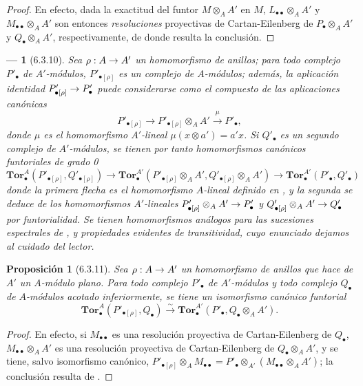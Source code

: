 \documentclass[10pt,oneside,openany]{book}
\theoremstyle{egaenv}\newtheorem*{env}{---}
\theoremstyle{egastatement}
\newtheorem*{proposition}{Proposición}
\theoremstyle{egadescription}
\newcommand{\oldpage}[2][]{\marginnote{\normalfont\scriptsize\textbf{#1}\,|\,#2}\ignorespaces}
\renewcommand{\to}{\mathchoice{\longrightarrow}{\rightarrow}{\rightarrow}{\rightarrow}}
\begin{document}
\begin{proof}
\oldpage[III]{145}
En efecto, dada la exactitud del funtor $M\otimes_A A'$ en $M$,
$L_{\bullet\bullet}\otimes_A A'$ y $M_{\bullet\bullet}\otimes_A A'$ son
entonces \emph{resoluciones} proyectivas de Cartan-Eilenberg de
$P_\bullet\otimes_A A'$ y $Q_\bullet\otimes_A A'$, respectivamente, de
donde resulta la conclusión.
\end{proof}

\begin{env}[6.3.10]
\label{III.6.3.10}
Sea $\rho:A\to A'$ un homomorfismo de anillos; para todo complejo
$P'_\bullet$ de $A'$-módulos, $P'_{\bullet[\rho]}$ es un complejo de
$A$-módulos; además, la aplicación identidad
$P'_{\bullet[\rho]}\to P'_\bullet$ puede considerarse como el compuesto de
las aplicaciones canónicas
\[
  P'_{\bullet[\rho]}\longrightarrow
  P'_{\bullet[\rho]}\otimes_A A'
  \xrightarrow{\mu}P'_\bullet,
\]
donde $\mu$ es el homomorfismo $A'$-lineal $\mu(x\otimes a')=a'x$. Si
$Q'_\bullet$
es un segundo complejo de $A'$-módulos, se tienen por tanto homomorfismos
canónicos funtoriales de grado 0
\[
  \mathbf{Tor}_\bullet^A(P'_{\bullet[\rho]},Q'_{\bullet[\rho]})
  \longrightarrow
  \mathbf{Tor}_\bullet^{A'}
  (P'_{\bullet[\rho]}\otimes_A A',Q'_{\bullet[\rho]}\otimes_A A')
  \longrightarrow
  \mathbf{Tor}_\bullet^{A'}(P'_\bullet,Q'_\bullet)
  \tag{6.3.10.1}\label{III.6.3.10.1.fr}
\]
donde la primera flecha es el homomorfismo $A$-lineal definido en
, y la
segunda se deduce de los homomorfismos $A'$-lineales
$P'_{\bullet[\rho]}\otimes_A A'\to P'_\bullet$ y
$Q'_{\bullet[\rho]}\otimes_A A'\to Q'_\bullet$ por funtorialidad. Se tienen
homomorfismos análogos para las sucesiones espectrales de
, y
propiedades evidentes de transitividad, cuyo enunciado dejamos al cuidado del
lector.
\end{env}

\begin{proposition}[6.3.11]
\label{III.6.3.11}
Sea $\rho:A\to A'$ un homomorfismo de anillos que hace de $A'$ un
$A$-módulo plano. Para todo complejo $P'_\bullet$ de $A'$-módulos y todo
complejo $Q_\bullet$ de $A$-módulos acotado inferiormente, se tiene un
isomorfismo canónico funtorial
\[
  \mathbf{Tor}_\bullet^A(P'_{\bullet[\rho]},Q_\bullet)
  \xrightarrow{\sim}
  \mathbf{Tor}_\bullet^{A'}(P'_\bullet,Q_\bullet\otimes_A A').
  \tag{6.3.11.1}\label{III.6.3.11.1.fr}
\]
\end{proposition}

\begin{proof}
En efecto, si $M_{\bullet\bullet}$ es una resolución proyectiva de
Cartan-Eilenberg de $Q_\bullet$, $M_{\bullet\bullet}\otimes_A A'$ es una
resolución proyectiva de Cartan-Eilenberg de $Q_\bullet\otimes_A A'$, y se
tiene, salvo isomorfismo canónico,
$P'_{\bullet[\rho]}\otimes_A M_{\bullet\bullet}
=P'_\bullet\otimes_{A'}(M_{\bullet\bullet}\otimes_A A')$;
la conclusión resulta de .
\end{proof}
\end{document}
